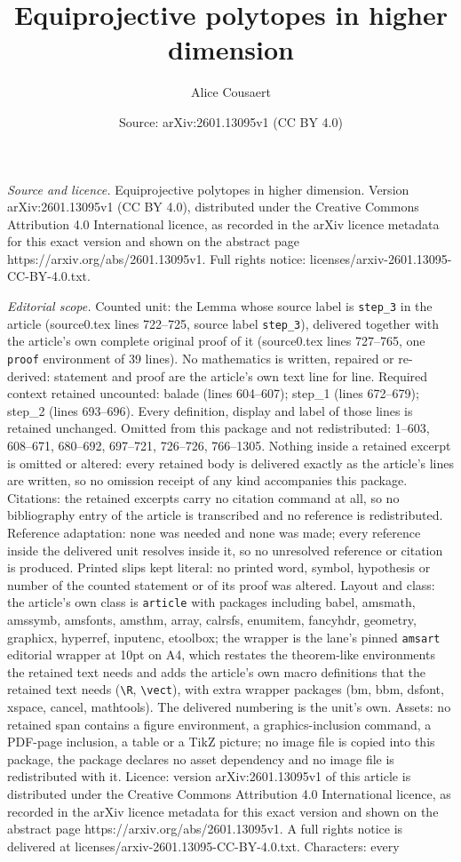 \documentclass[10pt,a4paper]{amsart}
\title[Equiprojective polytopes in higher dimension]{Equiprojective polytopes in higher dimension}
\author{Alice Cousaert}
\date{Source: arXiv:2601.13095v1 (CC BY 4.0)}
\begin{document}
\maketitle

\noindent\emph{Source and licence.} Equiprojective polytopes in higher dimension. Version arXiv:2601.13095v1 (CC BY 4.0), distributed under the Creative Commons Attribution 4.0 International licence, as recorded in the arXiv licence metadata for this exact version and shown on the abstract page https://arxiv.org/abs/2601.13095v1. Full rights notice: licenses/arxiv-2601.13095-CC-BY-4.0.txt.\par\smallskip

\noindent\textit{Editorial scope.} Counted unit: the Lemma whose source label is \texttt{step\_3} in the article (source0.tex lines 722--725, source label \texttt{step\_3}), delivered together with the article's own complete original proof of it (source0.tex lines 727--765, one \texttt{proof} environment of 39 lines). No mathematics is written, repaired or re-derived: statement and proof are the article's own text line for line. Required context retained uncounted: balade (lines 604--607); step\_1 (lines 672--679); step\_2 (lines 693--696). Every definition, display and label of those lines is retained unchanged. Omitted from this package and not redistributed: 1--603, 608--671, 680--692, 697--721, 726--726, 766--1305. Nothing inside a retained excerpt is omitted or altered: every retained body is delivered exactly as the article's lines are written, so no omission receipt of any kind accompanies this package. Citations: the retained excerpts carry no citation command at all, so no bibliography entry of the article is transcribed and no reference is redistributed. Reference adaptation: none was needed and none was made; every reference inside the delivered unit resolves inside it, so no unresolved reference or citation is produced. Printed slips kept literal: no printed word, symbol, hypothesis or number of the counted statement or of its proof was altered. Layout and class: the article's own class is \texttt{article} with packages including babel, amsmath, amssymb, amsfonts, amsthm, array, calrsfs, enumitem, fancyhdr, geometry, graphicx, hyperref, inputenc, etoolbox; the wrapper is the lane's pinned \texttt{amsart} editorial wrapper at 10pt on A4, which restates the theorem-like environments the retained text needs and adds the article's own macro definitions that the retained text needs (\texttt{\textbackslash R}, \texttt{\textbackslash vect}), with extra wrapper packages (bm, bbm, dsfont, xspace, cancel, mathtools). The delivered numbering is the unit's own. Assets: no retained span contains a figure environment, a graphics-inclusion command, a PDF-page inclusion, a table or a TikZ picture; no image file is copied into this package, the package declares no asset dependency and no image file is redistributed with it. Licence: version arXiv:2601.13095v1 of this article is distributed under the Creative Commons Attribution 4.0 International licence, as recorded in the arXiv licence metadata for this exact version and shown on the abstract page https://arxiv.org/abs/2601.13095v1. A full rights notice is delivered at licenses/arxiv-2601.13095-CC-BY-4.0.txt. Characters: every 
\end{document}
